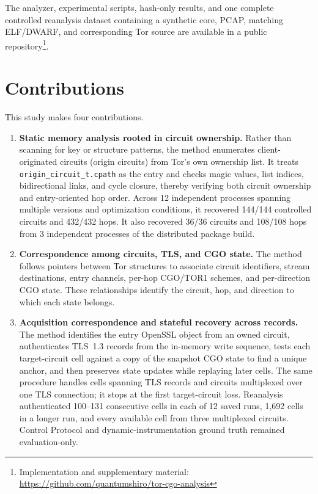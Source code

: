 \documentclass[10pt,a4paper]{article}
\newcommand{\code}[1]{\nolinkurl{#1}}
\newcommand{\torone}{\textsc{TOR1}}
\begin{document}
The analyzer, experimental scripts, hash-only results, and one complete controlled reanalysis dataset containing a synthetic core, PCAP, matching ELF/DWARF, and corresponding Tor source are available in a public repository\footnote{Implementation and supplementary material: \url{https://github.com/quantumshiro/tor-cgo-analysis}}.

\section{Contributions}\label{sec:contributions}

This study makes four contributions.

\begin{enumerate}[label=\textbf{C\arabic*.},leftmargin=3em]
  \item \textbf{Static memory analysis rooted in circuit ownership.}
  Rather than scanning for key or structure patterns, the method enumerates client-originated circuits (origin circuits) from Tor's own ownership list. It treats \code{origin_circuit_t.cpath} as the entry and checks magic values, list indices, bidirectional links, and cycle closure, thereby verifying both circuit ownership and entry-oriented hop order. Across 12 independent processes spanning multiple versions and optimization conditions, it recovered 144/144 controlled circuits and 432/432 hops. It also recovered 36/36 circuits and 108/108 hops from 3 independent processes of the distributed package build.

  \item \textbf{Correspondence among circuits, TLS, and CGO state.}
  The method follows pointers between Tor structures to associate circuit identifiers, stream destinations, entry channels, per-hop CGO/\torone{} schemes, and per-direction CGO state. These relationships identify the circuit, hop, and direction to which each state belongs.

  \item \textbf{Acquisition correspondence and stateful recovery across records.}
  The method identifies the entry OpenSSL object from an owned circuit, authenticates TLS~1.3 records from the in-memory write sequence, tests each target-circuit cell against a copy of the snapshot CGO state to find a unique anchor, and then preserves state updates while replaying later cells. The same procedure handles cells spanning TLS records and circuits multiplexed over one TLS connection; it stops at the first target-circuit loss. Reanalysis authenticated 100--131 consecutive cells in each of 12 saved runs, 1,692 cells in a longer run, and every available cell from three multiplexed circuits. Control Protocol and dynamic-instrumentation ground truth remained evaluation-only.


\end{enumerate}
\end{document}
